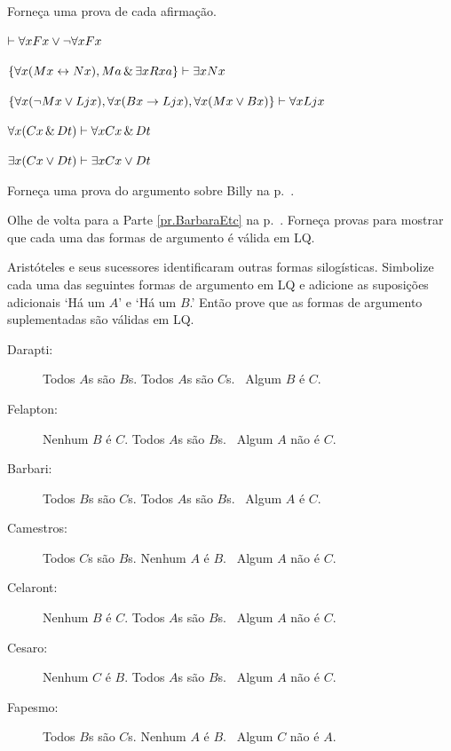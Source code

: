 \solutions
\problempart
\label{pr.someQLproofs}
Forneça uma prova de cada afirmação.
\begin{earg}
\item $\vdash \forall x Fx \vee \neg \forall x Fx$
\item $\{\forall x(Mx \leftrightarrow Nx), Ma\,\&\,\exists x Rxa\}\vdash \exists x Nx$
\item $\{\forall x(\neg Mx \vee Ljx), \forall x(Bx\rightarrow Ljx), \forall x(Mx\vee Bx)\}\vdash \forall xLjx$
\item $\forall x(Cx \,\&\, Dt)\vdash \forall xCx \,\&\, Dt$
\item $\exists x(Cx \vee Dt)\vdash \exists x Cx \vee Dt$
\end{earg}

\problempart
Forneça uma prova do argumento sobre Billy na p.~\pageref{surgeon2}.



\problempart
\label{pr.BarbaraEtc.proof1}
Olhe de volta para a Parte \ref{pr.BarbaraEtc} na p.~\pageref{pr.BarbaraEtc}. Forneça provas para mostrar que cada uma das formas de argumento é válida em LQ.



\problempart
\label{pr.BarbaraEtc.proof2}
Aristóteles e seus sucessores identificaram outras formas silogísticas. Simbolize cada uma das seguintes formas de argumento em LQ e adicione as suposições adicionais `Há um $A$' e `Há um $B$.' Então prove que as formas de argumento suplementadas são válidas em LQ.

\begin{description}
\item[Darapti:] Todos $A$s são $B$s. Todos $A$s são $C$s.
	\therefore\  Algum $B$ é $C$.
\item[Felapton:] Nenhum $B$ é $C$. Todos $A$s são $B$s.
	\therefore\  Algum $A$ não é $C$.
\item[Barbari:] Todos $B$s são $C$s. Todos $A$s são $B$s.
	\therefore\  Algum $A$ é $C$.
\item[Camestros:] Todos $C$s são $B$s. Nenhum $A$ é $B$.
	\therefore\  Algum $A$ não é $C$.
\item[Celaront:] Nenhum $B$ é $C$. Todos $A$s são $B$s.
	\therefore\  Algum $A$ não é $C$.
\item[Cesaro:] Nenhum $C$ é $B$. Todos $A$s são $B$s.
	\therefore\  Algum $A$ não é $C$.
\item[Fapesmo:] Todos $B$s são $C$s. Nenhum $A$ é $B$.
	\therefore\  Algum $C$ não é $A$.
\end{description}




